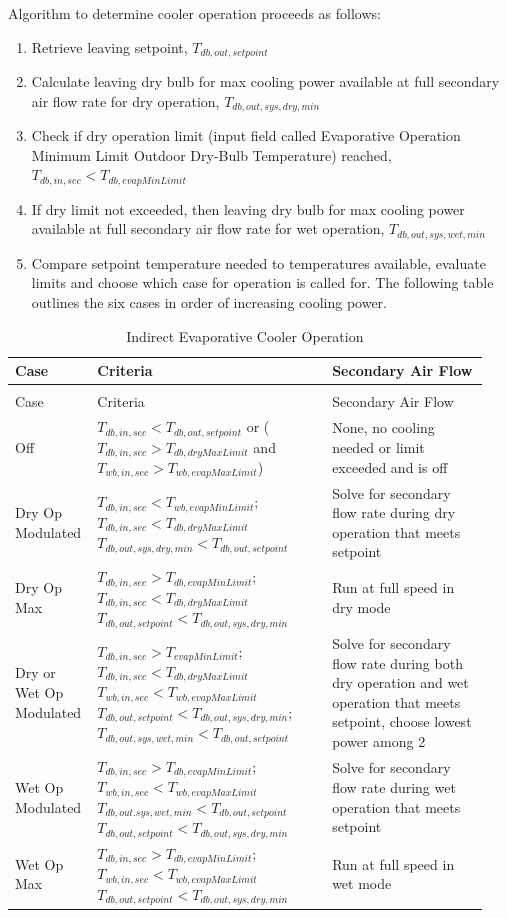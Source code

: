 Algorithm to determine cooler operation proceeds as follows:

\begin{enumerate}
\def\labelenumi{\arabic{enumi}.}
\item
  Retrieve leaving setpoint, \(T_{db,out,setpoint}\)
\item
  Calculate leaving dry bulb for max cooling power available at full secondary air flow rate for dry operation, \(T_{db,out,sys,dry,min}\)
\item
  Check if dry operation limit (input field called Evaporative Operation Minimum Limit Outdoor Dry-Bulb Temperature) reached, \(T_{db,in,sec}<T_{db,evapMinLimit}\)
\item
  If dry limit not exceeded, then leaving dry bulb for max cooling power available at full secondary air flow rate for wet operation, \(T_{db,out,sys,wet,min}\)
\item
  Compare setpoint temperature needed to temperatures available, evaluate limits and choose which case for operation is called for. The following table outlines the six cases in order of increasing cooling power.
\end{enumerate}

\begin{longtable}[c]{@{}p{0.14\linewidth}p{0.48\linewidth}p{0.32\linewidth}@{}}
\caption{Indirect Evaporative Cooler Operation \label{table:indirect-evaporative-cooler-operation}} \tabularnewline
\toprule
Case & Criteria & Secondary Air Flow \tabularnewline
\midrule
\endfirsthead

\caption[]{Indirect Evaporative Cooler Operation} \tabularnewline
\toprule
Case & Criteria & Secondary Air Flow \tabularnewline
\midrule
\endhead

Off & \(T_{db,in,sec}<T_{db,out,setpoint}\) or (\(T_{db,in,sec}>T_{db,dryMaxLimit}\) and \(T_{wb,in,sec}>T_{wb,evapMaxLimit}\)) & None, no cooling needed or limit exceeded and is off \tabularnewline
Dry Op Modulated & \(T_{db,in,sec}<T_{wb,evapMinLimit}\); \(T_{db,in,sec}<T_{db,dryMaxLimit}\) \(T_{db,out,sys,dry,min}<T_{db,out,setpoint}\) & Solve for secondary flow rate during dry operation that meets setpoint \tabularnewline
Dry Op Max & \(T_{db,in,sec}>T_{db,evapMinLimit}\); \(T_{db,in,sec}<T_{db,dryMaxLimit}\) \(T_{db,out,setpoint}<T_{db,out,sys,dry,min}\) & Run at full speed in dry mode \tabularnewline
Dry or Wet Op Modulated & \(T_{db,in,sec}>T_{evapMinLimit}\); \(T_{db,in,sec}<T_{db,dryMaxLimit}\) \(T_{wb,in,sec}<T_{wb,evapMaxLimit}\) \(T_{db,out,setpoint}<T_{db,out,sys,dry,min}\); \(T_{db,out,sys,wet,min}<T_{db,out,setpoint}\) & Solve for secondary flow rate during both dry operation and wet operation that meets setpoint, choose lowest power among 2 \tabularnewline
Wet Op Modulated & \(T_{db,in,sec}>T_{db,evapMinLimit}\); \(T_{wb,in,sec}<T_{wb,evapMaxLimit}\) \(T_{db,out.sys,wet,min}<T_{db,out,setpoint}\) \(T_{db,out,setpoint}<T_{db,out,sys,dry,min}\) & Solve for secondary flow rate during wet operation that meets setpoint \tabularnewline
Wet Op Max & \(T_{db,in,sec}>T_{db,evapMinLimit}\); \(T_{wb,in,sec}<T_{wb,evapMaxLimit}\) \(T_{db,out,setpoint}<T_{db,out,sys,dry,min}\) & Run at full speed in wet mode \tabularnewline
\bottomrule
\end{longtable}


